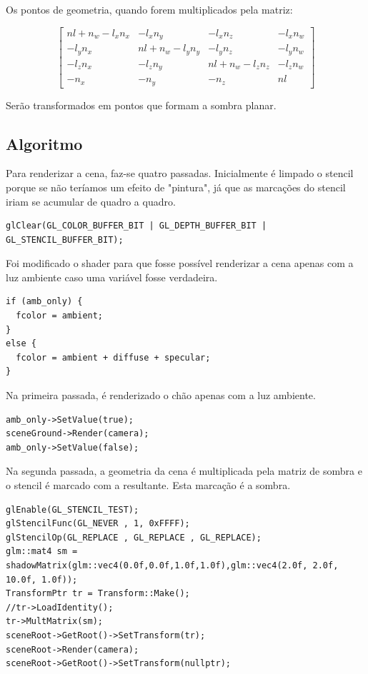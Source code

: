 \documentclass[11pt, a4paper]{article}
\begin{document}
Os pontos de geometria, quando forem multiplicados pela matriz:

\[
\begin{bmatrix}
  nl + n_{w} - l_{x}n_{x} & -l_{x}n_{y} & -l_{x}n_{z} & -l_{x}n_{w} \\
  -l_{y}n_{x} & nl + n_{w} - l_{y}n_{y} & -l_{y}n_{z} & -l_{y}n_{w} \\
  -l_{z}n_{x} & -l_{z}n_{y} & nl + n_{w} - l_{z}n_{z} & -l_{z}n_{w} \\
  -n_{x} & -n_{y} & -n_{z} & nl
\end{bmatrix}
\]

Serão transformados em pontos que formam a sombra planar.

\subsection{Algoritmo}
Para renderizar a cena, faz-se quatro passadas. Inicialmente é limpado o stencil 
porque se não teríamos um efeito de "pintura", já que as marcações do stencil 
iriam se acumular de quadro a quadro.

\begin{verbatim}
glClear(GL_COLOR_BUFFER_BIT | GL_DEPTH_BUFFER_BIT | GL_STENCIL_BUFFER_BIT);
\end{verbatim}

Foi modificado o shader para que fosse possível renderizar a cena apenas com a 
luz ambiente caso uma variável fosse verdadeira.

\begin{verbatim}
if (amb_only) {
  fcolor = ambient;
}
else {
  fcolor = ambient + diffuse + specular;
}
\end{verbatim}

Na primeira passada, é renderizado o chão apenas com a luz ambiente.

\begin{verbatim}
amb_only->SetValue(true);
sceneGround->Render(camera);
amb_only->SetValue(false);
\end{verbatim}


Na segunda passada, a geometria da cena é multiplicada pela matriz de sombra e o 
stencil é marcado com a resultante. Esta marcação é a sombra.

\begin{verbatim}
glEnable(GL_STENCIL_TEST);
glStencilFunc(GL_NEVER , 1, 0xFFFF);
glStencilOp(GL_REPLACE , GL_REPLACE , GL_REPLACE);
glm::mat4 sm = shadowMatrix(glm::vec4(0.0f,0.0f,1.0f,1.0f),glm::vec4(2.0f, 2.0f, 
10.0f, 1.0f));
TransformPtr tr = Transform::Make();
//tr->LoadIdentity();
tr->MultMatrix(sm);
sceneRoot->GetRoot()->SetTransform(tr);
sceneRoot->Render(camera);
sceneRoot->GetRoot()->SetTransform(nullptr);
\end{verbatim}
\end{document}
